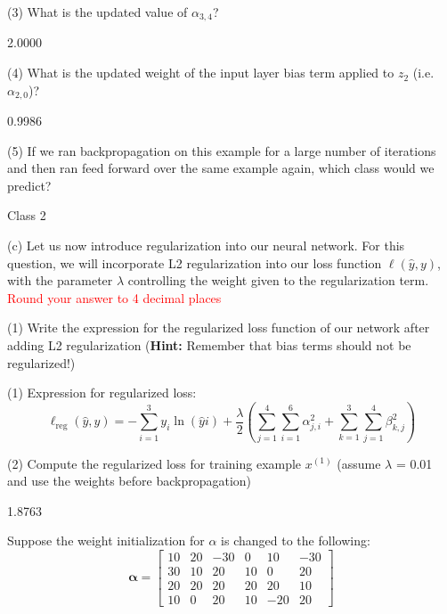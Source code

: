 (3) What is the updated value of ${\alpha}_{3,4}$?
\begin{tcolorbox}[fit,height=1cm, width=2cm, blank, borderline={1pt}{-2pt}]
    2.0000
\end{tcolorbox}

(4) What is the updated weight of the input layer bias term applied to $z_2$ (i.e. ${\alpha}_{2,0}$)?
\begin{tcolorbox}[fit,height=1cm, width=2cm, blank, borderline={1pt}{-2pt}]
    0.9986
\end{tcolorbox}

(5) If we ran backpropagation on this example for a large number of iterations and then ran feed forward over the same example again, which class would we predict?
\begin{tcolorbox}[fit,height=1cm, width=2cm, blank, borderline={1pt}{-2pt}]
    Class 2
\end{tcolorbox}



(c)  Let us now introduce regularization into our neural network. For this question, we will incorporate L2 regularization into our loss function $\ell(\hat{y},y)$, with the parameter $\lambda$ controlling the weight given to the regularization term. \textcolor{red}{Round your answer to 4 decimal places}

(1) Write the expression for the regularized loss function of our network after adding L2 regularization (\textbf{Hint:} Remember that bias terms should not be regularized!)
\begin{tcolorbox}[fit,height=3cm, width=10cm, blank, borderline={1pt}{-2pt}]
    (1) Expression for regularized loss: $$\ell_{\text{reg}}(\hat{y},y) = -\sum_{i=1}^3 y_i \ln(\hat{y}i) + \frac{\lambda}{2}\left(\sum_{j=1}^4 \sum_{i=1}^6 \alpha_{j,i}^2 + \sum_{k=1}^3\sum_{j=1}^4 \beta_{k,j}^2\right)$$
\end{tcolorbox}

(2) Compute the regularized loss for training example $x^{(1)}$ (assume $\lambda$ = 0.01 and use the weights before backpropagation)
\begin{tcolorbox}[fit,height=1cm, width=2cm, blank, borderline={1pt}{-2pt}]
    1.8763
\end{tcolorbox}

Suppose the weight initialization for $\alpha$ is changed to the following:
$$\boldsymbol{\alpha}=
\begin{bmatrix}
10 & 20 & -30 & 0 & 10 & -30 \\
30 & 10 & 20 & 10 & 0 & 20 \\
20 & 20 & 20 & 20 & 20 & 10 \\
10 & 0 & 20 & 10 & -20 & 20
\end{bmatrix}$$

